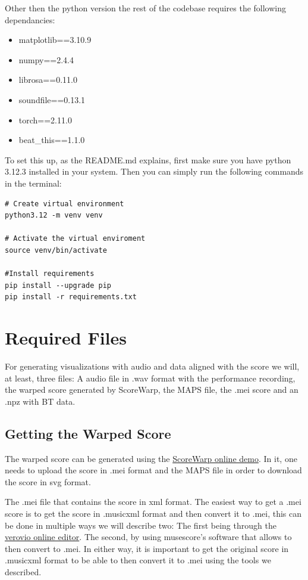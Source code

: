 Other then the python version the rest of the codebase requires the following dependancies:
\begin{itemize}
    \item matplotlib==3.10.9
    \item numpy==2.4.4
    \item librosa==0.11.0
    \item soundfile==0.13.1
    \item torch==2.11.0
    \item beat\_this==1.1.0
\end{itemize}

To set this up, as the README.md explains, first make sure you have python 3.12.3 installed in your system. Then you can simply run the following commands in the terminal:

\begin{verbatim}
# Create virtual environment
python3.12 -m venv venv

# Activate the virtual enviroment
source venv/bin/activate

#Install requirements
pip install --upgrade pip
pip install -r requirements.txt

\end{verbatim}


\section{Required Files}
For generating visualizations with audio and data aligned with the score we will, at least, three files: A audio file in .wav format with the performance recording, the warped score generated by ScoreWarp, the MAPS file, the .mei score and an .npz with BT data.

\subsection{Getting the Warped Score}
The warped score can be generated using the \href{https://iwk-digital.github.io/scorewarp/}{ScoreWarp online demo}.  In it, one needs to upload the score in .mei format and the MAPS file in order to download the score in svg format. 

The .mei file that contains the score in xml format. The easiest way to get a .mei score is to get the score in .musicxml format and then convert it to .mei, this can be done in multiple ways we will describe two: The first being through the \href{https://editor.verovio.org/}{verovio online editor}. The second, by using musescore's software that allows to then convert to .mei. In either way, it is important to get the original score in .musicxml format to be able to then convert it to .mei using the tools we described. 

